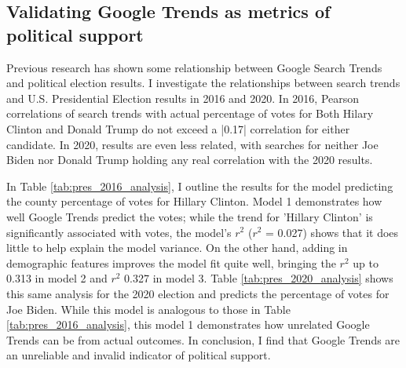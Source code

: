 \subsection{Validating Google Trends as metrics of political support}

Previous research has shown some relationship between Google Search Trends and
political election results. I investigate the relationships between search trends
and U.S. Presidential Election results in 2016 and 2020. In 2016, Pearson
correlations of search trends with actual percentage of votes for Both Hilary
Clinton and Donald Trump do not exceed a |0.17| correlation for either candidate. In 2020,
results are even less related, with searches for neither Joe Biden nor Donald
Trump holding any real correlation with the 2020 results.

In Table \ref{tab:pres_2016_analysis}, I outline the results for the model
predicting the county percentage of votes for Hillary Clinton. Model 1
demonstrates how well Google Trends predict the votes; while the trend for
'Hillary Clinton' is significantly associated with votes, the model's $r^2$
($r^2$ = 0.027) shows that it does little to help explain the model variance. On
the other hand, adding in demographic features improves the model fit quite
well, bringing the $r^2$ up to 0.313 in model 2 and $r^2$ 0.327 in model 3.
Table \ref{tab:pres_2020_analysis} shows this same analysis for the 2020
election and predicts the percentage of votes for Joe Biden. While this model is
analogous to those in Table \ref{tab:pres_2016_analysis}, this model 1
demonstrates how unrelated Google Trends can be from actual outcomes. In
conclusion, I find that Google Trends are an unreliable and invalid indicator of
political support.

